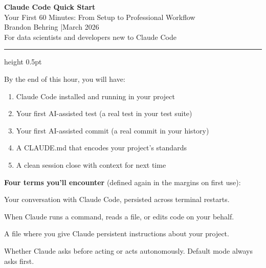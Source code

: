 \documentclass[10pt,oneside]{scrartcl}
\begin{document}

\begin{center}
  {\LARGE\bfseries\color{WarmBlue}Claude Code Quick Start}\\[4pt]
  {\large Your First 60 Minutes: From Setup to Professional Workflow}\\[6pt]
  {\normalsize Brandon Behring \quad|\quad March 2026}\\[2pt]
  {\footnotesize For data scientists and developers new to Claude Code}
\end{center}

\vspace{0.3cm}
\hrule height 0.5pt
\vspace{0.4cm}

By the end of this hour, you will have:
\begin{enumerate}
  \item Claude Code installed and running in your project
  \item Your first AI-assisted test (a real test in your test suite)
  \item Your first AI-assisted commit (a real commit in your history)
  \item A CLAUDE.md that encodes your project's standards
  \item A clean session close with context for next time
\end{enumerate}


\textbf{Four terms you'll encounter} (defined again in the margins on first use):
\begin{description}[leftmargin=2.2cm, style=sameline, font=\bfseries]
  \item[Session] Your conversation with Claude Code, persisted across terminal restarts.
  \item[Tool use] When Claude runs a command, reads a file, or edits code on your behalf.
  \item[CLAUDE.md] A file where you give Claude persistent instructions about your project.
  \item[Permission] Whether Claude asks before acting or acts autonomously. Default mode always asks first.
\end{description}
\end{document}
